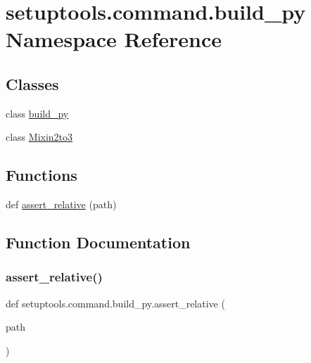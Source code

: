 \hypertarget{namespacesetuptools_1_1command_1_1build__py}{}\section{setuptools.\+command.\+build\+\_\+py Namespace Reference}
\label{namespacesetuptools_1_1command_1_1build__py}
\subsection*{Classes}
\begin{DoxyCompactItemize}
\item 
class \hyperlink{classsetuptools_1_1command_1_1build__py_1_1build__py}{build\+\_\+py}
\item 
class \hyperlink{classsetuptools_1_1command_1_1build__py_1_1_mixin2to3}{Mixin2to3}
\end{DoxyCompactItemize}
\subsection*{Functions}
\begin{DoxyCompactItemize}
\item 
def \hyperlink{namespacesetuptools_1_1command_1_1build__py_a1c5a9e809e618a17fb86cec7fcbdc25b}{assert\+\_\+relative} (path)
\end{DoxyCompactItemize}


\subsection{Function Documentation}
\mbox{\label{namespacesetuptools_1_1command_1_1build__py_a1c5a9e809e618a17fb86cec7fcbdc25b}} 
\subsubsection{\texorpdfstring{assert\+\_\+relative()}{assert\_relative()}}
{\footnotesize\ttfamily def setuptools.\+command.\+build\+\_\+py.\+assert\+\_\+relative (\begin{DoxyParamCaption}\item[{}]{path }\end{DoxyParamCaption})}

